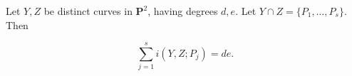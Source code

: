 Let $Y, Z$ be distinct curves in $\mathbf{P}^2$, having degrees $d, e$. Let $Y \cap Z = \{P_1, \ldots, P_s\}$. Then

$$\sum_{j=1}^{s} i(Y, Z; P_j) = d e.$$
